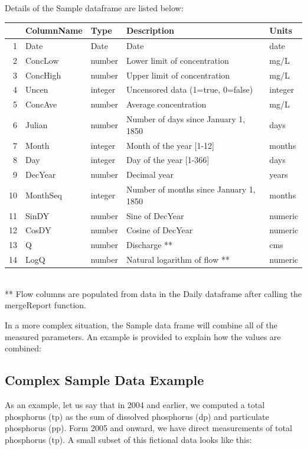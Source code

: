 \documentclass[a4paper,11pt]{article}
\begin{document}
Details of the Sample dataframe are listed below:

\begin{tabular}{rllll}
  \hline
 & ColumnName & Type & Description & Units \\ 
  \hline
1 & Date & Date & Date & date \\ 
  2 & ConcLow & number & Lower limit of concentration & mg/L \\ 
  3 & ConcHigh & number & Upper limit of concentration & mg/L \\ 
  4 & Uncen & integer & Uncensored data (1=true, 0=false) & integer \\ 
  5 & ConcAve & number & Average concentration & mg/L \\ 
  6 & Julian & number & Number of days since January 1, 1850 & days \\ 
  7 & Month & integer & Month of the year [1-12] & months \\ 
  8 & Day & integer & Day of the year [1-366] & days \\ 
  9 & DecYear & number & Decimal year & years \\ 
  10 & MonthSeq & integer & Number of months since January 1, 1850 & months \\ 
  11 & SinDY & number & Sine of DecYear & numeric \\ 
  12 & CosDY & number & Cosine of DecYear & numeric \\ 
  13 & Q & number & Discharge ** & cms \\ 
  14 & LogQ & number & Natural logarithm of flow ** & numeric \\ 
   \hline
\end{tabular}\\
** Flow columns are populated from data in the Daily dataframe after calling the mergeReport function.


In a more complex situation, the Sample data frame will combine all of the measured parameters.  An example is provided to explain how the values are combined:

\subsection{Complex Sample Data Example}
As an example, let us say that in 2004 and earlier, we computed a total phosphorus (tp) as the sum of dissolved phosphorus (dp) and particulate phosphorus (pp). Form 2005 and onward, we have direct measurements of total phosphorus (tp). A small subset of this fictional data looks like this:
\end{document}
